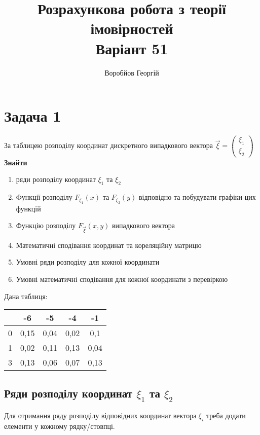 \documentclass{article}
\title{Розрахункова робота з теорії імовірностей \\
 Варіант 51}
\author{Воробйов Георгій}
\begin{document}
	\maketitle
	\tableofcontents
	
	\section{Задача 1}
	За таблицею розподілу координат дискретного випадкового вектора $\overrightarrow{\xi} = \left(\begin{array}{c}\xi_1 \\ \xi_2 \end{array} \right)$\\
	\textbf{Знайти}
	\begin{enumerate}
		\item ряди розподілу координат $\xi_1$ та $\xi_2$
		\item Функції розподілу $F_{\xi_1}(x)$ та $F_{\xi_2}(y)$ відповідно та побудувати графіки цих функцій
		\item Функцію розподілу $F_{\overrightarrow{\xi}}(x, y)$ випадкового вектора
		\item Математичні сподівання координат та кореляційну матрицю
		\item Умовні ряди розподілу для кожної координати
		\item Умовні математичні сподівання для кожної координати з перевіркою
    \end{enumerate}
	Дана таблиця:
	\begin{center}
	\begin{tabular}	{|c|c|c|c|c|}
		\hline
		\diagbox{$\xi_1$}{$\xi_2$} & -6 & -5 & -4 & -1 \\ \hline
		0 & 0,15 & 0,04 & 0,02 & 0,1 \\ \hline
		1 & 0,02 & 0,11 & 0,13 & 0,04 \\ \hline
		3 & 0,13 & 0,06 & 0,07 & 0,13 \\ \hline
	\end{tabular}
	\end{center}
	\newpage
	\subsection{Ряди розподілу координат $\xi_1$ та $\xi_2$}
	
	Для отримання ряду розподілу відповідних координат вектора $\xi_i$ треба додати елементи у кожному рядку/стовпці.
	
\end{document}
